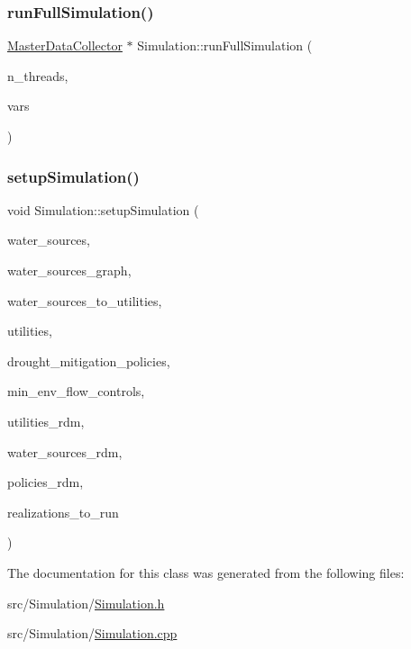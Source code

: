 \subsubsection{\texorpdfstring{run\+Full\+Simulation()}{runFullSimulation()}}
{\footnotesize\ttfamily \mbox{\hyperlink{classMasterDataCollector}{Master\+Data\+Collector}} $\ast$ Simulation\+::run\+Full\+Simulation (\begin{DoxyParamCaption}\item[{unsigned long}]{n\+\_\+threads,  }\item[{double $\ast$}]{vars }\end{DoxyParamCaption})}

\mbox{\label{classSimulation_ac9ff965191f13b1ce044344fd1e5d0ac}} 
\subsubsection{\texorpdfstring{setup\+Simulation()}{setupSimulation()}}
{\footnotesize\ttfamily void Simulation\+::setup\+Simulation (\begin{DoxyParamCaption}\item[{vector$<$ \mbox{\hyperlink{classWaterSource}{Water\+Source}} $\ast$$>$ \&}]{water\+\_\+sources,  }\item[{\mbox{\hyperlink{classGraph}{Graph}} \&}]{water\+\_\+sources\+\_\+graph,  }\item[{const vector$<$ vector$<$ int $>$$>$ \&}]{water\+\_\+sources\+\_\+to\+\_\+utilities,  }\item[{vector$<$ \mbox{\hyperlink{classUtility}{Utility}} $\ast$$>$ \&}]{utilities,  }\item[{const vector$<$ \mbox{\hyperlink{classDroughtMitigationPolicy}{Drought\+Mitigation\+Policy}} $\ast$$>$ \&}]{drought\+\_\+mitigation\+\_\+policies,  }\item[{vector$<$ \mbox{\hyperlink{classMinEnvFlowControl}{Min\+Env\+Flow\+Control}} $\ast$$>$ \&}]{min\+\_\+env\+\_\+flow\+\_\+controls,  }\item[{vector$<$ vector$<$ double $>$$>$ \&}]{utilities\+\_\+rdm,  }\item[{vector$<$ vector$<$ double $>$$>$ \&}]{water\+\_\+sources\+\_\+rdm,  }\item[{vector$<$ vector$<$ double $>$$>$ \&}]{policies\+\_\+rdm,  }\item[{vector$<$ unsigned long $>$ \&}]{realizations\+\_\+to\+\_\+run }\end{DoxyParamCaption})}



The documentation for this class was generated from the following files\+:\begin{DoxyCompactItemize}
\item 
src/\+Simulation/\mbox{\hyperlink{Simulation_8h}{Simulation.\+h}}\item 
src/\+Simulation/\mbox{\hyperlink{Simulation_8cpp}{Simulation.\+cpp}}\end{DoxyCompactItemize}
